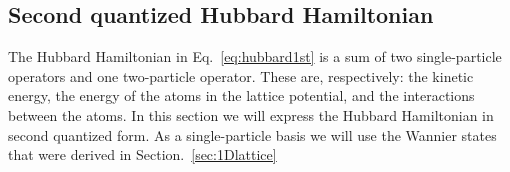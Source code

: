 \subsection{Second quantized Hubbard Hamiltonian}

The Hubbard Hamiltonian in Eq.~\ref{eq:hubbard1st} is a sum of two
single-particle operators and one two-particle operator.  These are,
respectively: the kinetic energy, the energy of the atoms in the lattice
potential, and the interactions between the atoms.  In this section we will
express the Hubbard Hamiltonian in second quantized form.  As a single-particle
basis we will use the Wannier states that were derived in
Section.~\ref{sec:1Dlattice}


